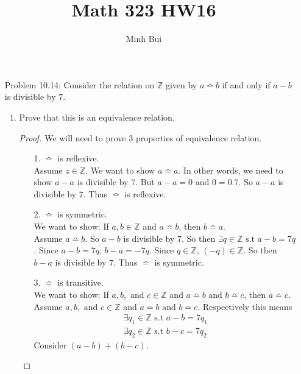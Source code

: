 \documentclass{article}
\author{Minh Bui}
\title{Math 323 HW16}
\theoremstyle{claim}
\theoremstyle{definition}
\begin{document}
\maketitle
\begin{enumerate}
    \item[Problem 10.14:] Consider the relation on $\mathbb{Z}$ given by $a \bumpeq b$ if and only if $a - b$ is divisible by $7$.
        \begin{enumerate}
            \item Prove that this is an equivalence relation.
            \begin{proof}
                We will need to prove 3 properties of equivalence relation.
                \begin{enumerate}
                    \item[1.] $\bumpeq$ is reflexive.\\
                        Assume $z \in \mathbb{Z}$. We want to show $a \bumpeq a$. In other words, we need to show $a - a$ is divisible by $7$. But $a - a = 0$ and $0 = 0 . 7$. So $a - a$ is divisible by $7$. Thus $\bumpeq$ is reflexive.
                    \item[2.] $\bumpeq$ is symmetric.\\
                        We want to show: If $a, b \in \mathbb{Z}$ and $a \bumpeq b$, then $b \bumpeq a$.\\
                        Assume $a \bumpeq b$. So $a - b$ is divisible by $7$. So then $\exists q \in \mathbb{Z} \text{ s.t } a - b = 7q$. Since $a - b = 7q$, $b - a = -7q$. Since $q \in \mathbb{Z}$, $(-q) \in \mathbb{Z}$. So then $b - a$ is divisible by $7$. Thus $\bumpeq$ is symmetric.
                    \item[3.] $\bumpeq$ is transitive.\\
                        We want to show: If $a, b, \text{ and } c \in \mathbb{Z}$ and $a \bumpeq b$ and $b \bumpeq c$, then $a \bumpeq c$.\\
                        Assume $a, b, \text{ and } c \in \mathbb{Z}$ and $a \bumpeq b$ and $b \bumpeq c$. Respectively this means
                        \begin{gather*}
                            \exists q_1 \in \mathbb{Z} \text{ s.t } a - b = 7q_1\\
                            \exists q_2 \in \mathbb{Z} \text{ s.t } b - c = 7q_2
                        \end{gather*}
                        Consider $(a - b) + (b - c)$.

\end{enumerate}
\end{proof}
\end{enumerate}
\end{enumerate}
\end{document}
